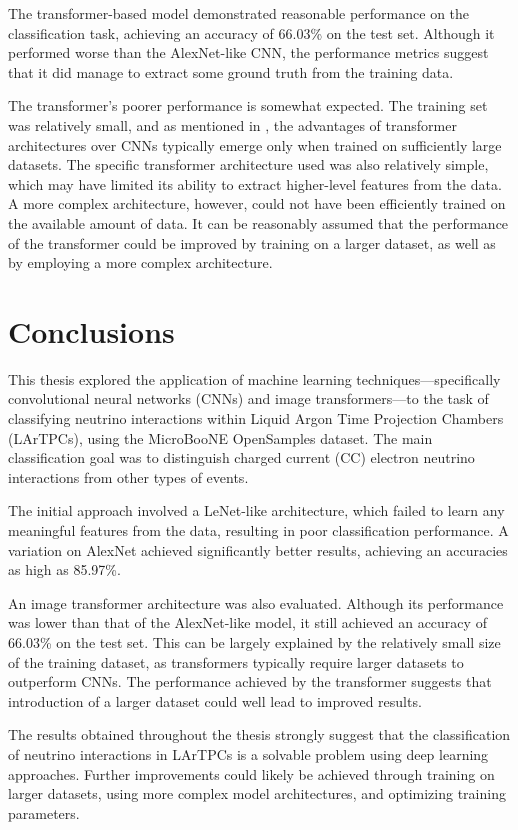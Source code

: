 \documentclass{pracalicmgr}
\begin{document}
The transformer-based model demonstrated reasonable performance on the classification task, achieving an accuracy of 66.03\% on the test set. Although it performed worse than the AlexNet-like CNN, the performance metrics suggest that it did manage to extract some ground truth from the training data.

The transformer's poorer performance is somewhat expected. The training set was relatively small, and as mentioned in \cite{ViT}, the advantages of transformer architectures over CNNs typically emerge only when trained on sufficiently large datasets. The specific transformer architecture used was also relatively simple, which may have limited its ability to extract higher-level features from the data. A more complex architecture, however, could not have been efficiently trained on the available amount of data. It can be reasonably assumed that the performance of the transformer could be improved by training on a larger dataset, as well as by employing a more complex architecture.

\chapter{Conclusions}

This thesis explored the application of machine learning techniques—specifically convolutional neural networks (CNNs) and image transformers—to the task of classifying neutrino interactions within Liquid Argon Time Projection Chambers (LArTPCs), using the MicroBooNE OpenSamples dataset. The main classification goal was to distinguish charged current (CC) electron neutrino interactions from other types of events.

The initial approach involved a LeNet-like architecture, which failed to learn any meaningful features from the data, resulting in poor classification performance.
A variation on AlexNet achieved significantly better results, achieving an accuracies as high as 85.97\%.

An image transformer architecture was also evaluated. Although its performance was lower than that of the AlexNet-like model, it still achieved an accuracy of 66.03\% on the test set. This can be largely explained by the relatively small size of the training dataset, as transformers typically require larger datasets to outperform CNNs. The performance achieved by the transformer suggests that introduction of a larger dataset could well lead to improved results.

The results obtained throughout the thesis strongly suggest that the classification of neutrino interactions in LArTPCs is a solvable problem using deep learning approaches. Further improvements could likely be achieved through training on larger datasets, using more complex model architectures, and optimizing training parameters.
\end{document}
